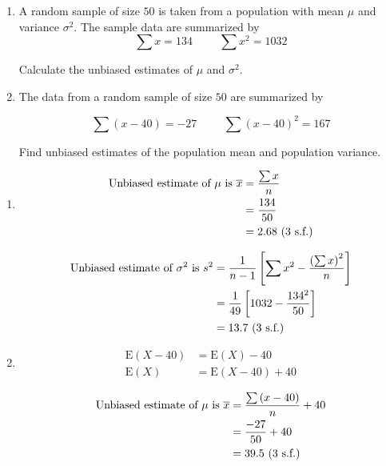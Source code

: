 \documentclass[11pt,a4paper]{book}
\begin{document}
\begin{example}

\begin{enumerate}[label=(\alph*)]

\item A random sample of size $50$ is taken from a population with
mean $\mu$ and variance $\sigma^{2}$. The sample data are summarized
by
\[
\sum x=134\hspace{1cm}\sum x^{2}=1032
\]

Calculate the unbiased estimates of $\mu$ and $\sigma^{2}$.

\item  The data from a random sample of size $50$ are summarized
by

\[
\sum\left(x-40\right)=-27\hspace{1cm}\sum\left(x-40\right)^{2}=167
\]

Find unbiased estimates of the population mean and population variance.

\end{enumerate}

\Solution

\begin{enumerate}[label=(\alph*)]

\item
\begin{align*}
\text{Unbiased estimate of \ensuremath{\mu} is }\overline{x} & =\frac{\sum x}{n}\\
 & =\frac{134}{50}\\
 & =2.68\text{ (3 s.f.)}
\end{align*}

\begin{align*}
\text{Unbiased estimate of \ensuremath{\sigma^{2}} is }s^{2} & =\frac{1}{n-1}\left[\sum x^{2}-\frac{\left(\sum x\right)^{2}}{n}\right]\\
 & =\frac{1}{49}\left[1032-\frac{134^{2}}{50}\right]\\
 & =13.7\text{ (3 s.f.)}
\end{align*}

\item
\begin{align*}
\text{E}\left(X-40\right) & =\text{E}\left(X\right)-40\\
\text{E}\left(X\right) & =\text{E}\left(X-40\right)+40
\end{align*}

\begin{align*}
\text{Unbiased estimate of \ensuremath{\mu} is }\overline{x} & =\frac{\sum\left(x-40\right)}{n}+40\\
 & =\frac{-27}{50}+40\\
 & =39.5\text{ (3 s.f.)}
\end{align*}


\end{enumerate}
\end{example}
\end{document}
